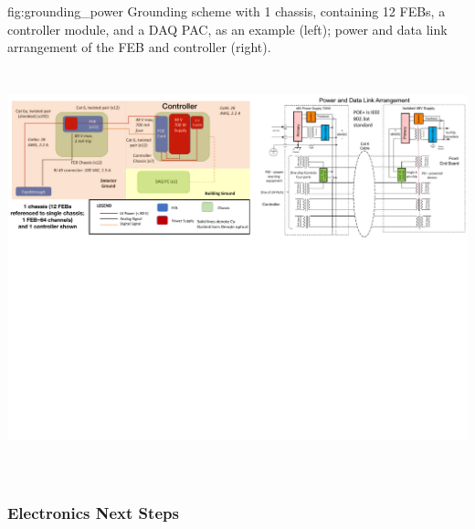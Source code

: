 \begin{dunefigure}
 {fig:grounding_power}
 {Grounding scheme with 1 chassis, containing 12 FEBs, a controller module, and a DAQ PAC, as an example (left); power and data link arrangement of the FEB and controller (right).}
\includegraphics[height=4.8in]{graphics/pds-grounding-power.pdf} 
\vspace{-7.1cm}
\end{dunefigure}



\subsubsection{Electronics Next Steps}


